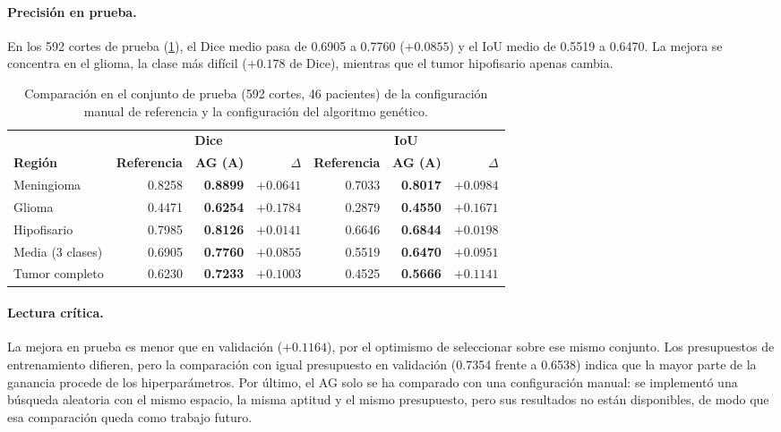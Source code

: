 \paragraph{Precisión en prueba.} En los 592 cortes de prueba (\cref{tab:prueba-ag}), el Dice medio pasa de 0.6905 a 0.7760 ($+0.0855$) y el IoU medio de 0.5519 a 0.6470. La mejora se concentra en el glioma, la clase más difícil ($+0.178$ de Dice), mientras que el tumor hipofisario apenas cambia.

\clearpage

\begin{table}[htbp]
  \centering
  \caption{Comparación en el conjunto de prueba (592 cortes, 46 pacientes) de la configuración manual de referencia y la configuración del algoritmo genético.}
  \label{tab:prueba-ag}
  \begin{tabular}{lrrrrrr}
    \toprule
    & \multicolumn{3}{c}{\textbf{Dice}} & \multicolumn{3}{c}{\textbf{IoU}} \\
    \cmidrule(lr){2-4}\cmidrule(lr){5-7}
    \textbf{Región} & \textbf{Referencia} & \textbf{AG (A)} & $\Delta$ & \textbf{Referencia} & \textbf{AG (A)} & $\Delta$ \\
    \midrule
    Meningioma   & 0.8258 & \textbf{0.8899} & $+0.0641$ & 0.7033 & \textbf{0.8017} & $+0.0984$ \\
    Glioma       & 0.4471 & \textbf{0.6254} & $+0.1784$ & 0.2879 & \textbf{0.4550} & $+0.1671$ \\
    Hipofisario  & 0.7985 & \textbf{0.8126} & $+0.0141$ & 0.6646 & \textbf{0.6844} & $+0.0198$ \\
    \midrule
    Media (3 clases) & 0.6905 & \textbf{0.7760} & $+0.0855$ & 0.5519 & \textbf{0.6470} & $+0.0951$ \\
    Tumor completo   & 0.6230 & \textbf{0.7233} & $+0.1003$ & 0.4525 & \textbf{0.5666} & $+0.1141$ \\
    \bottomrule
  \end{tabular}
\end{table}

\paragraph{Lectura crítica.} La mejora en prueba es menor que en validación ($+0.1164$), por el optimismo de seleccionar sobre ese mismo conjunto. Los presupuestos de entrenamiento difieren, pero la comparación con igual presupuesto en validación (0.7354 frente a 0.6538) indica que la mayor parte de la ganancia procede de los hiperparámetros. Por último, el AG solo se ha comparado con una configuración manual: se implementó una búsqueda aleatoria con el mismo espacio, la misma aptitud y el mismo presupuesto, pero sus resultados no están disponibles, de modo que esa comparación queda como trabajo futuro.
